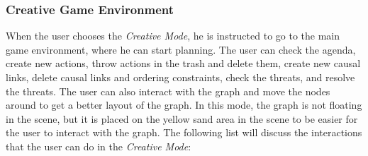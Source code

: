 \subsubsection{Creative Game Environment} \label{subsubsec:creative_game_environment}
When the user chooses the \textit{Creative Mode}, he is instructed to go to the main game environment, where he can start planning. The user can check the agenda, create new actions, throw actions in the trash and delete them, create new causal links, delete causal links and ordering constraints, check the threats, and resolve the threats. The user can also interact with the graph and move the nodes around to get a better layout of the graph. In this mode, the graph is not floating in the scene, but it is placed on the yellow sand area in the scene to be easier for the user to interact with the graph. The following list will discuss the interactions that the user can do in the \textit{Creative Mode}:

